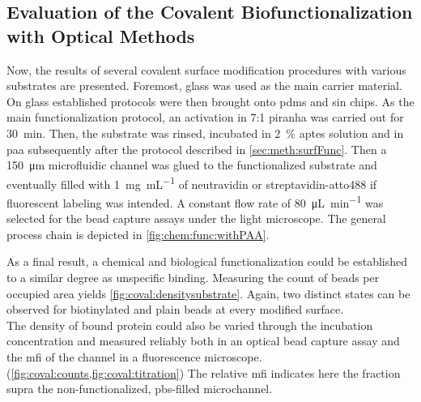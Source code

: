 \subsection{Evaluation of the Covalent Biofunctionalization with Optical Methods}
\label{sec:res:coval}
Now, the results of several covalent surface modification procedures with various substrates are presented. Foremost, glass was used as the main carrier material. On glass established protocols were then brought onto \gls{pdms} and \gls{sin} chips. As the main functionalization protocol, an activation in 7:1 \gls{piranha} was carried out for \SI{30}{\minute}. Then, the substrate was rinsed, incubated in \SI{2}{\percent} \gls{aptes} solution and in \gls{paa} subsequently after the protocol described in \cref{sec:meth:surfFunc}. Then a \SI{150}{\micro\meter} microfluidic channel was glued to the functionalized substrate and eventually filled with \SI{1}{\milli\gram\per\milli\liter} of neutravidin or streptavidin-atto488 if fluorescent labeling was intended. A constant flow rate of \SI{80}{\micro\liter\per\minute} was selected for the bead capture assays under the light microscope. The general process chain is depicted in \cref{fig:chem:func:withPAA}.


As a final result, a chemical and biological functionalization could be established to a similar degree as unspecific binding. Measuring the count of beads per occupied area yields \cref{fig:coval:densitysubstrate}. Again, two distinct states can be observed for biotinylated and plain beads at every modified surface.\\
The density of bound protein could also be varied through the incubation concentration and measured reliably both in an optical bead capture assay and the \gls{mfi} of the channel in a fluorescence microscope.(\cref{fig:coval:counts,fig:coval:titration}) The relative \gls{mfi} indicates here the fraction supra the non-functionalized, \gls{pbs}-filled microchannel. 

